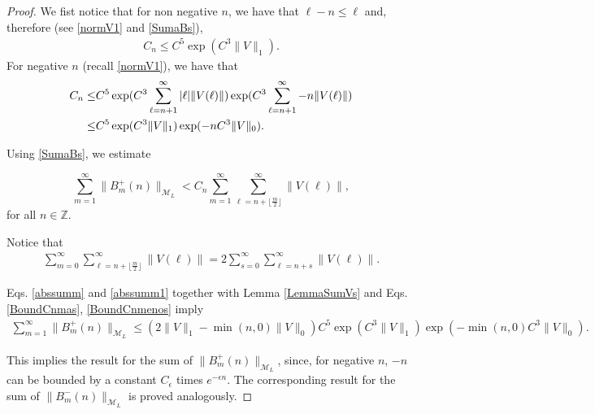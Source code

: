 \documentclass[12pt,oneside,onecolumn,open]{article}
\begin{document}
\begin{proof}
    We fist notice that for non negative  $ n $, we have that $\ell -n  \leq \ell $ and, therefore (see \eqref{normV1} and \eqref{SumaBs}),  
\begin{align}\label{BoundCnmas}
C_n \leq C^5 \exp(  C^3 \| V \|_{1}    ) . 
\end{align}
For negative $n $ (recall \eqref{normV1}), we have that  
\begin{align}\label{BoundCnmenos}
C_n \leq  & C^5 \exp(  C^3 \sum_{\ell = n+1}^\infty  |\ell| \| V(\ell) \|     ) \exp(  C^3 \sum_{\ell = n+1}^\infty  -n \| V(\ell) \|     ) 
\\ \notag 
\leq & C^5 \exp(  C^3 \| V \|_{1}    )  \exp( -n C^3 \| V \|_{0}    ). 
\end{align}






Using \eqref{SumaBs}, we estimate

\begin{equation}\label{abssumm}
    \sum _{m=1}^{\infty }\|B^{+}_m(n)\|_{\mathcal{M}_L}<C_{n}\sum _{m=1}^{\infty} \sum_{\ell=n+\lfloor\frac{m}{2}\rfloor}^\infty \lVert V(\ell ) \rVert ,
\end{equation} for all $n\in \mathbb{Z}.$



Notice that 
\begin{align}\label{abssumm1}
\sum_{m = 0}^{\infty} \sum_{\ell=n+\lfloor\frac{m}{2}\rfloor}^\infty \lVert V(\ell ) \rVert  =  2 \sum_{s = 0}^{\infty} \sum_{\ell=n+  s}^\infty \lVert V(\ell ) \rVert .\end{align}

Eqs. \eqref{abssumm} and \eqref{abssumm1} together with Lemma \ref{LemmaSumVs}  and Eqs.  \eqref{BoundCnmas}, \eqref{BoundCnmenos}  imply 
\begin{align}
 \sum _{m=1}^{\infty }\|B^{+}_m(n)\|_{\mathcal{M}_L} \leq (2 \| V  \|_{ 1} -  \min(n, 0) \| V \|_0)    C^5 \exp(  C^3 \| V \|_{1}    )  \exp( -  \min(n,0)  C^3 \| V \|_{0}    ). 
\end{align}

This implies the result for the sum of $  \| B^+_{m}(n) \|_{\mathcal{M}_L} $, since, for negative  $n$, 
$ -n $ can be bounded by a constant $C_{\epsilon}$ times $ e^{-\epsilon n} $.  
The corresponding result for the sum of  $  \| B^-_{m}(n) \|_{\mathcal{M}_L} $ is proved analogously. 


\end{proof}
\end{document}
